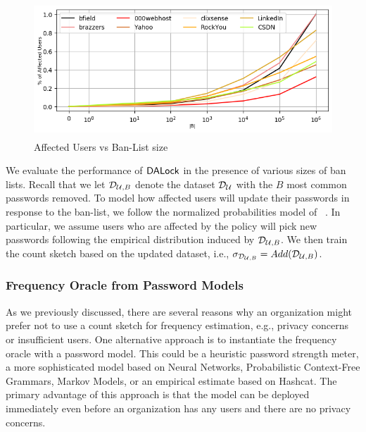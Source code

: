 \begin{figure}[htb]	
	\begin{center}
		\vspace{-0.2cm}
		\includegraphics[height=2in,width=\linewidth]{Figures/Experiments/AffectedUsers}
		\vspace{-0.5cm}
		\caption{Affected Users vs Ban-List size}\label{figure: affectedusers}
		\vspace{-0.5cm}
	\end{center}
\end{figure}

We evaluate the performance of $\mathsf{DALock}$ in the presence of various sizes of ban lists. Recall that we let $\mathcal{D}_{{\mathcal{U}, B}}$ denote the dataset $\mathcal{D}_{{\mathcal{U}}}$ with the $B$ most common passwords removed. To model how affected users will update their passwords in response to the ban-list, we follow the normalized probabilities model of ~\cite{BKPS:ACMEC13}. In particular, we assume users who are affected by the policy will pick new passwords following the empirical distribution induced by $\mathcal{D}_{{\mathcal{U}, B}}$. We then train the count sketch based on the updated dataset, i.e., $\sigma_{\mathcal{D}_{{\mathcal{U}, B}}} = Add(\mathcal{D}_{{\mathcal{U}, B}})$.




\subsubsection{Frequency Oracle from Password Models}


As we previously discussed, there are several reasons why an organization might prefer not to use a count sketch for frequency estimation, e.g., privacy concerns or insufficient users. One alternative approach is to instantiate the frequency oracle with a password model. This could be a heuristic password strength meter, a more sophisticated model based on Neural Networks, Probabilistic Context-Free Grammars,  Markov Models, or an empirical estimate based on Hashcat. The primary advantage of this approach is that the model can be deployed immediately even before an organization has any users and there are no privacy concerns. 


